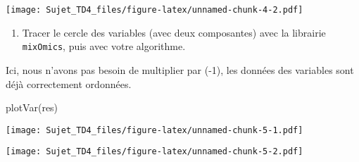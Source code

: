 \documentclass[
]{article}
\newenvironment{Shaded}{\begin{snugshade}}{\end{snugshade}}
\newcommand{\AttributeTok}[1]{\textcolor[rgb]{0.77,0.63,0.00}{#1}}
\newcommand{\DecValTok}[1]{\textcolor[rgb]{0.00,0.00,0.81}{#1}}
\newcommand{\FloatTok}[1]{\textcolor[rgb]{0.00,0.00,0.81}{#1}}
\newcommand{\FunctionTok}[1]{\textcolor[rgb]{0.00,0.00,0.00}{#1}}
\newcommand{\NormalTok}[1]{#1}
\newcommand{\SpecialCharTok}[1]{\textcolor[rgb]{0.00,0.00,0.00}{#1}}
\newcommand{\StringTok}[1]{\textcolor[rgb]{0.31,0.60,0.02}{#1}}
\providecommand{\tightlist}{%
  \setlength{\itemsep}{0pt}\setlength{\parskip}{0pt}}
\begin{document}
\texttt{[image: Sujet\_TD4\_files/figure-latex/unnamed-chunk-4-2.pdf]}

\begin{enumerate}
\def\labelenumi{\arabic{enumi}.}
\setcounter{enumi}{2}
\tightlist
\item
  Tracer le cercle des variables (avec deux composantes) avec la
  librairie \texttt{mixOmics}, puis avec votre algorithme.
\end{enumerate}

Ici, nous n'avons pas besoin de multiplier par (-1), les données des
variables sont déjà correctement ordonnées.

\begin{Shaded}
\begin{Highlighting}[]
\FunctionTok{plotVar}\NormalTok{(res)}
\end{Highlighting}
\end{Shaded}

\texttt{[image: Sujet\_TD4\_files/figure-latex/unnamed-chunk-5-1.pdf]}

\begin{Shaded}
\end{Shaded}

\texttt{[image: Sujet\_TD4\_files/figure-latex/unnamed-chunk-5-2.pdf]}
\end{document}
